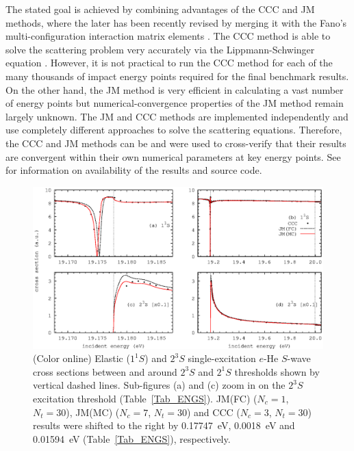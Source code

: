 \documentclass[aip
, pra
, showpacs
, aps
, twocolumn
, groupedaddress
, floatfix
]{revtex4}
\begin{document}
The stated goal is achieved by combining advantages of the CCC and JM methods,
where the later has been recently revised \cite{KFB11} by merging it with the Fano's multi-configuration interaction matrix elements \cite{Fano65}.
The CCC method is able to solve the scattering problem very accurately via the Lippmann-Schwinger equation \cite{BS92p6995}.
However, it is not practical to run the CCC method for each of the many thousands of impact energy points required for the final benchmark results.
On the other hand, the JM method is very efficient \cite{HY74p1201,BR76p1491} in calculating a vast number of energy points
but numerical-convergence properties of the JM method remain largely unknown.
The JM and CCC methods are implemented independently and use completely different approaches to solve the scattering equations.
Therefore, the CCC and JM methods can be and were used to cross-verify that their results are convergent within their own numerical parameters at key energy points.
See \cite{JMatrixWebsite} for information on availability of the results and source code.


\begin{figure}[htb]
\includegraphics[scale=1]{fig1.ps}
\caption{(Color online) Elastic ($1^1S$) and
$2^3S$ single-excitation $e$-He $S$-wave cross sections between and around $2^3S$ and $2^1S$ thresholds shown by vertical dashed lines.
Sub-figures (a) and (c) zoom in on the $2^3S$ excitation threshold (Table~\ref{Tab_ENGS}).
JM(FC) ($N_c=1$, $N_t=30$), JM(MC) ($N_c=7$, $N_t=30$) and CCC ($N_c=3$, $N_t=30$) results  were shifted to the right by 0.17747~eV, 0.0018~eV
and 0.01594~eV (Table~\ref{Tab_ENGS}), respectively.
}
\label{Fig_1}
\end{figure}
\end{document}
